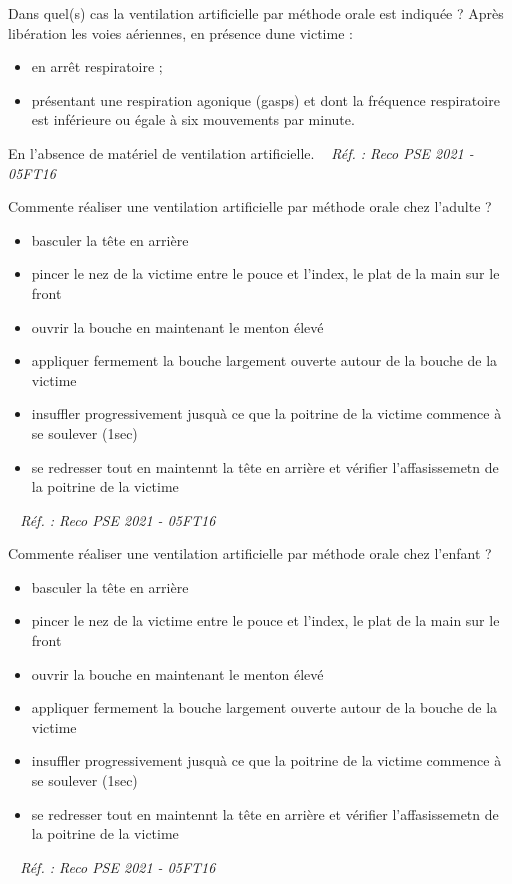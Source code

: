\documentclass[grid,avery5371,landscape]{flashcards}
\makeatletter
\newcounter{nocarte}
\newcommand{\categ}[1]{%
  \def\@categ{#1}%
  \setcounter{nocarte}{0}%
}
\newcommand{\source}[1]{%
  \medskip
  \itshape%
   ~ \hfill Réf. : #1}
\makeatother
\begin{document}
\color[HTML]{003273}
\categ{PSE}
\begin{flashcard}[CAT]{
 Dans quel(s) cas la ventilation artificielle par méthode orale est indiquée ?   }
  Après libération les voies aériennes, en présence dune victime : \begin{itemize}
\item en arrêt respiratoire ;
\item présentant une respiration agonique (gasps) et dont la fréquence respiratoire est inférieure ou égale à six mouvements par minute.
\end{itemize} 
En l'absence de matériel de ventilation artificielle.
  \source{Reco PSE 2021 - 05FT16}
\end{flashcard}


\color[HTML]{003273}
\categ{PSE}
\begin{flashcard}[geste]{
 Commente réaliser une ventilation artificielle par méthode orale chez l'adulte ?   }
  \begin{itemize}
\item basculer la tête en arrière
\item pincer le nez de la victime entre le pouce et l'index, le plat de la main sur le front
\item ouvrir la bouche en maintenant le menton élevé 
\item appliquer fermement la bouche largement ouverte autour de la bouche de la victime
\item insuffler progressivement jusquà ce que la poitrine de la victime commence à se soulever (1sec)
\item se redresser tout en maintennt la tête en arrière et vérifier l'affasissemetn de la poitrine de la victime
\end{itemize}
  \source{Reco PSE 2021 - 05FT16}
\end{flashcard}


\color[HTML]{003273}
\categ{PSE}
\begin{flashcard}[geste]{
 Commente réaliser une ventilation artificielle par méthode orale chez l'enfant ?   }
  \begin{itemize}
\item basculer la tête en arrière
\item pincer le nez de la victime entre le pouce et l'index, le plat de la main sur le front
\item ouvrir la bouche en maintenant le menton élevé 
\item appliquer fermement la bouche largement ouverte autour de la bouche de la victime
\item insuffler progressivement jusquà ce que la poitrine de la victime commence à se soulever (1sec)
\item se redresser tout en maintennt la tête en arrière et vérifier l'affasissemetn de la poitrine de la victime
\end{itemize}
  \source{Reco PSE 2021 - 05FT16}
\end{flashcard}
\end{document}
